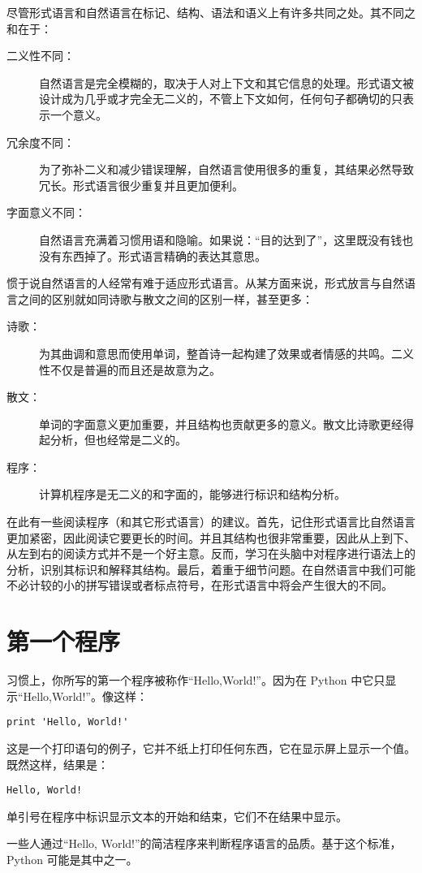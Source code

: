 尽管形式语言和自然语言在标记、结构、语法和语义上有许多共同之处。其不同之和在于：
\begin{description}
\item[二义性不同：]自然语言是完全模糊的，取决于人对上下文和其它信息的处理。形式语文被设计成为几乎或才完全无二义的，不管上下文如何，任何句子都确切的只表示一个意义。
\item[冗余度不同：]为了弥补二义和减少错误理解，自然语言使用很多的重复，其结果必然导致冗长。形式语言很少重复并且更加便利。
\item[字面意义不同：]自然语言充满着习惯用语和隐喻。如果说：“目的达到了”，这里既没有钱也没有东西掉了。形式语言精确的表达其意思。
\end{description}
惯于说自然语言的人经常有难于适应形式语言。从某方面来说，形式放言与自然语言之间的区别就如同诗歌与散文之间的区别一样，甚至更多：
\begin{description}
\item[诗歌：]为其曲调和意思而使用单词，整首诗一起构建了效果或者情感的共鸣。二义性不仅是普遍的而且还是故意为之。
\item[散文：]单词的字面意义更加重要，并且结构也贡献更多的意义。散文比诗歌更经得起分析，但也经常是二义的。
\item[程序：]计算机程序是无二义的和字面的，能够进行标识和结构分析。
\end{description}
在此有一些阅读程序（和其它形式语言）的建议。首先，记住形式语言比自然语言更加紧密，因此阅读它要更长的时间。并且其结构也很非常重要，因此从上到下、从左到右的阅读方式并不是一个好主意。反而，学习在头脑中对程序进行语法上的分析，识别其标识和解释其结构。最后，着重于细节问题。在自然语言中我们可能不必计较的小的拼写错误或者标点符号，在形式语言中将会产生很大的不同。

\section{第一个程序}
习惯上，你所写的第一个程序被称作“Hello,World!”。因为在 Python 中它只显示“Hello,World!”。像这样：
\begin{lstlisting}
print 'Hello, World!'
\end{lstlisting}

这是一个打印语句的例子，它并不纸上打印任何东西，它在显示屏上显示一个值。既然这样，结果是：
\begin{lstlisting}
Hello, World!
\end{lstlisting}
单引号在程序中标识显示文本的开始和结束，它们不在结果中显示。
 
一些人通过“Hello, World!”的简洁程序来判断程序语言的品质。基于这个标准，Py\-thon 可能是其中之一。
